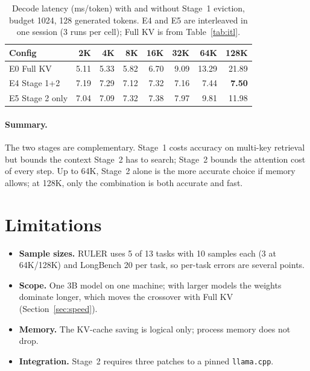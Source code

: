\documentclass[10pt,letterpaper]{article}
\newcommand{\code}[1]{\texttt{#1}}
\newcommand{\best}[1]{\textbf{#1}}
\begin{document}
\begin{table}[h]
\centering\small
\caption{Decode latency (ms/token) with and without Stage~1 eviction, budget 1024, 128 generated tokens. E4 and E5 are interleaved in one session (3 runs per cell); Full KV is from Table~\ref{tab:itl}.}
\label{tab:ablation-latency}
\begin{tabular}{lrrrrrrr}
\toprule
Config & 2K & 4K & 8K & 16K & 32K & 64K & 128K \\
\midrule
E0 Full KV & 5.11 & 5.33 & 5.82 & 6.70 & 9.09 & 13.29 & 21.89 \\
E4 Stage 1+2 & 7.19 & 7.29 & 7.12 & 7.32 & 7.16 & 7.44 & \best{7.50} \\
E5 Stage 2 only & 7.04 & 7.09 & 7.32 & 7.38 & 7.97 & 9.81 & 11.98 \\
\bottomrule
\end{tabular}
\end{table}

\FloatBarrier
\paragraph{Summary.}
The two stages are complementary. Stage~1 costs accuracy on multi-key retrieval but bounds the context Stage~2 has to search; Stage~2 bounds the attention cost of every step. Up to 64K, Stage~2 alone is the more accurate choice if memory allows; at 128K, only the combination is both accurate and fast.

\section{Limitations}
\begin{itemize}
\item \textbf{Sample sizes.} RULER uses 5 of 13 tasks with 10 samples each (3 at 64K/128K) and LongBench 20 per task, so per-task errors are several points.
\item \textbf{Scope.} One 3B model on one machine; with larger models the weights dominate longer, which moves the crossover with Full KV (Section~\ref{sec:speed}).
\item \textbf{Memory.} The KV-cache saving is logical only; process memory does not drop.
\item \textbf{Integration.} Stage~2 requires three patches to a pinned \code{llama.cpp}.
\end{itemize}
\end{document}
